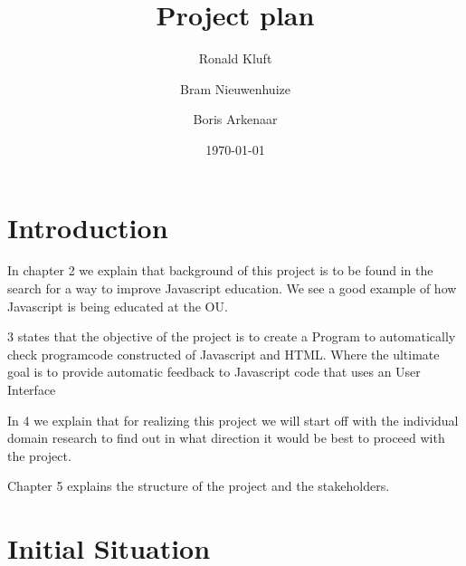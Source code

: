 \documentclass{article}
\begin{document}
\title{Project plan}
\author{Ronald Kluft \and Bram Nieuwenhuize \and Boris Arkenaar}
\date{\today}
\maketitle

\section{Introduction}


In chapter 2 we explain that background of this project is to be found in the search for a way to improve Javascript education. We see a good example of how Javascript is being educated at the OU.

3 states that the objective of the project is to create a Program to automatically check programcode constructed of Javascript and HTML.
Where the ultimate goal is to provide automatic feedback to Javascript code that uses an User Interface

In 4 we explain that for realizing this project we will start off with the individual domain research to find out in what direction it would be best to proceed with the project.

Chapter 5 explains the structure of the project and the stakeholders.

\section{Initial Situation}
\end{document}
